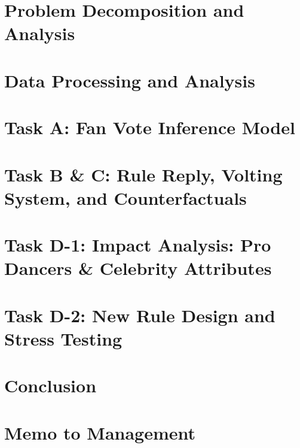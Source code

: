 \documentclass[a4paper,12pt]{article}
\begin{document}
\section{Problem Decomposition and Analysis}\label{sec:problem_decomposition_and_analysis}



\section{Data Processing and Analysis}\label{sec:data}


\section{Task A: Fan Vote Inference Model}\label{sec:A}


\section{Task B \& C: Rule Reply, Volting System, and Counterfactuals}\label{sec:B_and_C}


\section{Task D-1: Impact Analysis: Pro Dancers \& Celebrity Attributes}\label{sec:D1}


\section{Task D-2: New Rule Design and Stress Testing}\label{sec:D2}


\section{Conclusion}\label{sec:conclusion}


\section{Memo to Management}\label{sec:memo}





\end{document}
